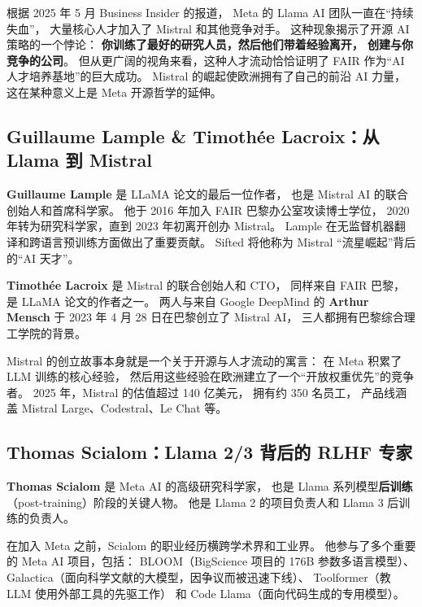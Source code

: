 \begin{corebox}
根据 2025 年 5 月 Business Insider 的报道，
Meta 的 Llama AI 团队一直在``持续失血''，
大量核心人才加入了 Mistral 和其他竞争对手。
这种现象揭示了开源 AI 策略的一个悖论：
\textbf{你训练了最好的研究人员，然后他们带着经验离开，
创建与你竞争的公司}。
但从更广阔的视角来看，这种人才流动恰恰证明了
FAIR 作为``AI 人才培养基地''的巨大成功。
Mistral 的崛起使欧洲拥有了自己的前沿 AI 力量，
这在某种意义上是 Meta 开源哲学的延伸。
\end{corebox}

\subsection{Guillaume Lample \& Timoth\'ee Lacroix：从 Llama 到 Mistral}

\textbf{Guillaume Lample} 是 LLaMA 论文的最后一位作者，
也是 Mistral AI 的联合创始人和首席科学家。
他于 2016 年加入 FAIR 巴黎办公室攻读博士学位，
2020 年转为研究科学家，直到 2023 年初离开创办 Mistral。
Lample 在无监督机器翻译和跨语言预训练方面做出了重要贡献。
Sifted 将他称为 Mistral ``流星崛起''背后的``AI 天才''。

\textbf{Timoth\'ee Lacroix} 是 Mistral 的联合创始人和 CTO，
同样来自 FAIR 巴黎，是 LLaMA 论文的作者之一。
两人与来自 Google DeepMind 的 \textbf{Arthur Mensch}
于 2023 年 4 月 28 日在巴黎创立了 Mistral AI，
三人都拥有巴黎综合理工学院的背景。

Mistral 的创立故事本身就是一个关于开源与人才流动的寓言：
在 Meta 积累了 LLM 训练的核心经验，
然后用这些经验在欧洲建立了一个``开放权重优先''的竞争者。
2025 年，Mistral 的估值超过 140 亿美元，
拥有约 350 名员工，
产品线涵盖 Mistral Large、Codestral、Le Chat 等。

\subsection{Thomas Scialom：Llama 2/3 背后的 RLHF 专家}

\textbf{Thomas Scialom} 是 Meta AI 的高级研究科学家，
也是 Llama 系列模型\textbf{后训练}（post-training）阶段的关键人物。
他是 Llama 2 的项目负责人和 Llama 3 后训练的负责人。

在加入 Meta 之前，Scialom 的职业经历横跨学术界和工业界。
他参与了多个重要的 Meta AI 项目，包括：
BLOOM（BigScience 项目的 176B 参数多语言模型）、
Galactica（面向科学文献的大模型，因争议而被迅速下线）、
Toolformer（教 LLM 使用外部工具的先驱工作）
和 Code Llama（面向代码生成的专用模型）。

